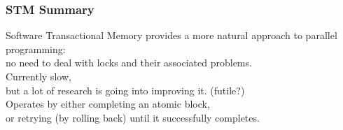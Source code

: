 \begin{frame}
  \frametitle{STM Summary}


     Software Transactional Memory provides a more natural approach to
      parallel programming: \\ \qquad no need to deal with locks and their associated problems.\\[1em]

     Currently slow,\\ \qquad but a lot of research is going into improving it. (futile?)\\[1em]

     Operates by either completing an atomic block,\\ or retrying (by rolling
      back) until it successfully completes.

\end{frame}




